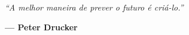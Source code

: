 \begin{epigrafe}
    \vspace*{\fill}
    \begin{flushright}
        \textit{“A melhor maneira de prever o futuro é criá-lo.”}
        
        \vspace{0.2cm}
        \textbf{— Peter Drucker}
    \end{flushright}
\end{epigrafe}